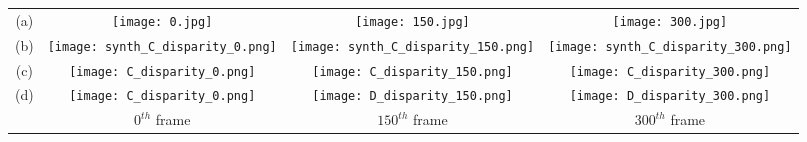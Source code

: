 \documentclass[10pt,twocolumn,letterpaper]{article}
\def\netname{\emph{MADNet}}
\def\algoname{\emph{MAD}}
\def\kitti{KITTI}
\begin{document}
\begin{figure*}
	\setlength{\tabcolsep}{1pt}
	\center
	\begin{tabular}{cccc}
		\vspace{1pt}
		(a)&
		\texttt{[image: 0.jpg]} & 
		\texttt{[image: 150.jpg]} & 
		\texttt{[image: 300.jpg]} \\
		
		\vspace{1pt}
		(b)&
		\texttt{[image: synth\_C\_disparity\_0.png]} &
		\texttt{[image: synth\_C\_disparity\_150.png]} &
		\texttt{[image: synth\_C\_disparity\_300.png]}\\
		
		\vspace{1pt}
		(c)&
		\texttt{[image: C\_disparity\_0.png]} &
		\texttt{[image: C\_disparity\_150.png]} &
		\texttt{[image: C\_disparity\_300.png]}\\
		
		\vspace{1pt}
		(d)&
		\texttt{[image: C\_disparity\_0.png]} &
		\texttt{[image: D\_disparity\_150.png]} &
		\texttt{[image: D\_disparity\_300.png]}\\
		
		\vspace{1pt}
		&$0^{th}$ frame & $150^{th}$ frame & $300^{th}$ frame\\
		
	\end{tabular}
	\caption{Disparity maps predicted by \netname{} on a \kitti{} sequence  \cite{KITTI_RAW}. Left images (a), no adaptation (b), online adaptation of the \emph{whole} network (c), online adaptation by \algoname{} (d).}
	\label{fig:teaser}
\end{figure*}
\end{document}
